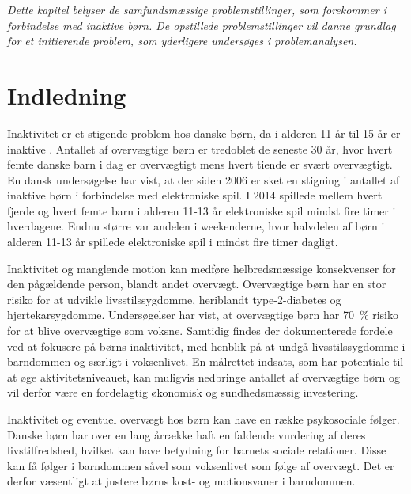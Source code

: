 \textit{Dette kapitel belyser de samfundsmæssige problemstillinger, som forekommer i forbindelse med inaktive børn. De opstillede problemstillinger vil danne grundlag for et initierende problem, som yderligere undersøges i problemanalysen.}

\section{Indledning}
Inaktivitet er et stigende problem hos danske børn, da  i alderen 11 år til 15 år er inaktive \citep{SundhedsstyrrelsenFaktaark}. Antallet af overvægtige børn er tredoblet de seneste 30 år, hvor hvert femte danske barn i dag er overvægtigt mens hvert tiende er svært overvægtigt. \citep{Universitet2014,Vindum2012} %
En dansk undersøgelse har vist, at der siden 2006 er sket en stigning i antallet af inaktive børn i forbindelse med elektroniske spil. I 2014 spillede mellem hvert fjerde og hvert femte barn i alderen 11-13 år elektroniske spil mindst fire timer i hverdagene. Endnu større var andelen i weekenderne, hvor halvdelen af børn i alderen 11-13 år spillede elektroniske spil i mindst fire timer dagligt. \citep{Universitet2014} 

Inaktivitet og manglende motion kan medføre helbredsmæssige konsekvenser for den pågældende person, blandt andet overvægt. Overvægtige børn har en stor risiko for at udvikle livsstilssygdomme, heriblandt type-2-diabetes og hjertekarsygdomme. Undersøgelser har vist, at overvægtige børn har 70~\% risiko for at blive overvægtige som voksne. \citep{Reilly2006} Samtidig findes der dokumenterede fordele ved at fokusere på børns inaktivitet, med henblik på at undgå livsstilssygdomme i barndommen og særligt i voksenlivet. En målrettet indsats, som har potentiale til at øge aktivitetsniveauet, kan muligvis nedbringe antallet af overvægtige børn og vil derfor være en fordelagtig økonomisk og sundhedsmæssig investering. \citep{COWI2015}

Inaktivitet og eventuel overvægt hos børn kan have en række psykosociale følger. Danske børn har over en lang årrække haft en faldende vurdering af deres livstilfredshed, hvilket kan have betydning for barnets sociale relationer. Disse kan få følger i barndommen såvel som voksenlivet som følge af overvægt. \citep{Universitet2014,StatensInstitutforFolkesundhed2007} Det er derfor væsentligt at justere børns kost- og motionsvaner i barndommen. \newpage

